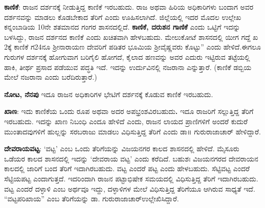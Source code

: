 \textbf{ಕಾಣಿಕೆ}: ರಾಜನ ದರ್ಶನಕ್ಕೆ ನೀಡುತ್ತಿದ್ದ ಕಾಣಿಕೆ ಇರಬಹುದು. ರಾಜ ಅಥವಾ ಹಿರಿಯ ಅಧಿಕಾರಿಗಳು ಬಂದಾಗ ಅವರ ದರ್ಶನವನ್ನು ಮಾಡಲು ಕೊಡಬೇಕಾದ ತೆರಿಗೆ ಎಂದು ಊಹಿಸಲಾಗಿದೆ. ಜಿಲ್ಲೆಯಲ್ಲಿ ಇದರ ಮೊದಲ ಉಲ್ಲೇಖ ಕನ್ನಂಬಾಡಿಯ 10ನೇ ಶತಮಾನದ ಗಂಗರ ಶಾಸನದಲ್ಲಿದೆ. \textbf{ಕಾಣಿಕೆ, ದರುಶನ ಗಾಣಿಕೆ} ಎಂದು ಒಟ್ಟಿಗೆ ಇದನ್ನು ಬಳಸಿದ್ದು, ರಾಜನ ದರ್ಶನದ ಕಾಣಿಕೆ ಎಂದು ಖಚಿತವಾಗಿ ಹೇಳಬಹುದು. ಮೇಲುಕೋಟೆ ಶಾಸನದಲ್ಲಿ ಯೀಗ ಗದ್ದೆ ಖ 2ಕ್ಕೆ ಕಾಣಿಕೆ ಗ24ನೂ ಶ‍್ರೀನಾರಾಯಣ ದೇವರಿಗೆ ಪಡಿತರ ಭೂಮಿಯ ಶ‍್ರೀವೈಷ್ಣವರು ಕೊಟ್ಟು” ಎಂದು ಹೇಳಿದೆ.ಈಗಲೂ ಗುರುಗಳ ದರ್ಶನಕ್ಕೆ ಹೋಗುವಾಗ ಬರಿಗೈಲಿ ಹೋಗದೆ, ಕೈಲಾದ ಹಣವನ್ನು ಅವರ ಎದುರು ಇಟ್ಟಿರುವ ತಟ್ಟೆಯಲ್ಲಿ ಹಾಕಿ, ತೀರ್ಥ ಪ್ರಸಾದ ಪಡೆಯುವ ಪದ್ಧತಿ ಇದೆ. ಇದನ್ನು ಉರ್ದುವಿನಲ್ಲಿ ನಜರಾನಾ ಎನ್ನುತ್ತಾರೆ. (ಕಾಣಿಕೆ ಡಬ್ಬಿಯ ಮೇಲೆ ನಜರಾನಾ ಎಂದು ಬರೆದಿರುತ್ತಾರೆ.)

\vskip 3pt

\textbf{ನೋಟ, ನೆನಪು} ಇದೂ ರಾಜನ ಅಧಿಕಾರಿಗಳ ಭೇಟಿಗೆ ದರ್ಶನಕ್ಕೆ ಕೊಡುವ ಕಾಣಿಕೆ ಇರಬಹುದು.

\vskip 3pt

\textbf{ಖಾಣ}: ಇದು ಕಾಣಿಕೆಯ ಒಂದು ರೂಪ ಅಥವಾ ಅದರ ಅಪಭ್ರಂಶವಿರಬಹುದು\textbf{. }ಇದೂ ರಾಜರಿಗೆ ಸಲ್ಲುತ್ತಿದ್ದ ತೆರಿಗೆ ಇರಬಹುದು. ಇದನ್ನು ಖಾಣ ನಿಬಂಧಿ ಎಂದೂ ಹೇಳಿದೆ ಎಂದು, ರಾಜನ ಲಾಯದ ಪ್ರಾಣಿಗಳಿಗೆ ಅಂದರೆ ಕುದುರೆ ಮುಂತಾದವುಗಳಿಗೆ ಹುಲ್ಲನ್ನು ಸರಬರಾಜು ಮಾಡಲು ವಿಧಿಸುತ್ತಿದ್ದ ತೆರಿಗೆ ಎಂದು ಡಾ॥ ಗುರುರಾಜಾಚಾರ್​ ಹೇಳಿದ್ದಾರೆ.

\vskip 3pt

\textbf{ದೇವರಾಯವಟ್ಟ}: ‘ವಟ್ಟ’ ಎಂಬ ಒಂದು ತೆರಿಗೆಯನ್ನು ವಿಜಯನಗರ ಕಾಲದ ಶಾಸನದಲ್ಲಿ ಹೇಳಿದೆ. ಮೈಸೂರು ಒಡೆಯರ ಕಾಲದ ಶಾಸನದಲ್ಲಿ ಇದನ್ನು ‘ದೇವರಾಯ ವಟ್ಟ’ ಎಂದು ಕರೆದಿದೆ. ಬಹುಶಃ ವಿಜಯನಗರದ ದೇವರಾಯನ ಕಾಲದಲ್ಲಿ ಜಾರಿಗೆ ಬಂದ ತೆರಿಗೆ ಇದಾಗಿರಬಹುದು. ವಟ್ಟ ಎಂದರೆ ಪಟ್ಟ ಎಂದು ಹೇಳಬಹುದು. ಸೆಟ್ಟಿವಟ್ಟ ಎಂದರೆ ಸೆಟ್ಟಿಯಪಟ್ಟ ಎಂದಾಗುತ್ತದೆ. ಇದರಿಂದಾಗಿ ರಾಜನ ಪಟ್ಟಾಭಿಷೇಕ ಸಮಯದಲ್ಲಿ ವಿಧಿಸುತ್ತಿದ್ದ ತೆರಿಗೆ ಇದಾಗಿರಬಹುದು. ವಟ್ಟ ಎಂದರೆ ದಳ್ಳಾಳಿ ಎಂಬ ಅರ್ಥವೂ ಇದ್ದು, ದಳ್ಳಾಳಿಗಳ ಮೇಲೆ ವಿಧಿಸುತ್ತಿದ್ದ ತೆರಿಗೆಯೂ ಆಗಿರುವ ಸಾಧ್ಯತೆ ಇದೆ. “ವಟ್ಟಪರಿಖಾಯ” ಎಂಬ ತೆರಿಗೆಯನ್ನು ಡಾ. ಗುರುರಾಜಾಚಾರ್​ ಉಲ್ಲೇಖಿಸಿದ್ದಾರೆ.

